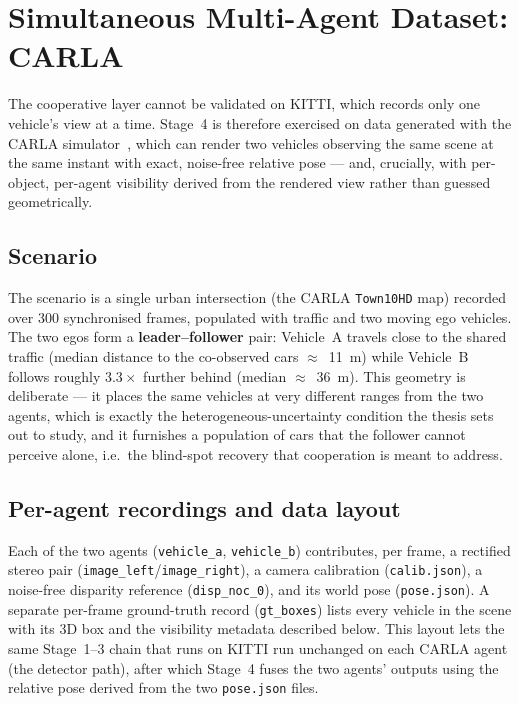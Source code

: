\section{Simultaneous Multi-Agent Dataset: CARLA}
\label{sec:carla}

The cooperative layer cannot be validated on KITTI, which records only one vehicle's
view at a time. Stage~4 is therefore exercised on data generated with the CARLA
simulator~\cite{dosovitskiy2017carla}, which can render two vehicles observing the
same scene at the same instant with exact, noise-free relative pose --- and,
crucially, with per-object, per-agent visibility derived from the rendered view
rather than guessed geometrically.

\subsection{Scenario}

The scenario is a single urban intersection (the CARLA \texttt{Town10HD} map)
recorded over 300 synchronised frames, populated with traffic and two moving ego
vehicles. The two egos form a \textbf{leader--follower} pair: Vehicle~A travels close
to the shared traffic (median distance to the co-observed cars $\approx$~11~m) while
Vehicle~B follows roughly $3.3\times$ further behind (median $\approx$~36~m). This
geometry is deliberate --- it places the same vehicles at very different ranges from
the two agents, which is exactly the heterogeneous-uncertainty condition the thesis
sets out to study, and it furnishes a population of cars that the follower cannot
perceive alone, i.e.\ the blind-spot recovery that cooperation is meant to address.

\subsection{Per-agent recordings and data layout}

Each of the two agents (\texttt{vehicle\_a}, \texttt{vehicle\_b}) contributes, per
frame, a rectified stereo pair (\texttt{image\_left}/\texttt{image\_right}), a camera
calibration (\texttt{calib.json}), a noise-free disparity reference
(\texttt{disp\_noc\_0}), and its world pose (\texttt{pose.json}). A separate
per-frame ground-truth record (\texttt{gt\_boxes}) lists every vehicle in the scene
with its 3D box and the visibility metadata described below. This layout lets the
same Stage~1--3 chain that runs on KITTI run unchanged on each CARLA agent (the
detector path), after which Stage~4 fuses the two agents' outputs using the relative
pose derived from the two \texttt{pose.json} files.

